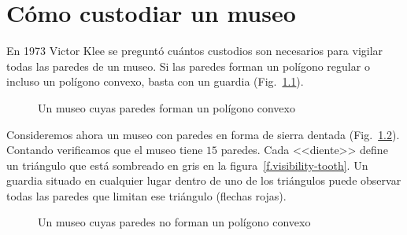 
\chapter{Cómo custodiar un museo}\label{c.museum}


En 1973 Victor Klee se preguntó cuántos custodios son necesarios para vigilar todas las paredes de un museo. Si las paredes forman un polígono regular o incluso un polígono convexo, basta con un guardia (Fig.~\ref{f.museum.convex}).
\begin{figure}[ht]
\begin{center}
\end{center}
\caption{Un museo cuyas paredes forman un polígono convexo}\label{f.museum.convex}
\end{figure}

Consideremos ahora un museo con paredes en forma de sierra dentada (Fig.~\ref{f.museum.nonconvex}). Contando verificamos que el museo tiene $15$ paredes. Cada <<diente>> define un triángulo que está sombreado en gris en la figura~\ref{f.visibility-tooth}. Un guardia situado en cualquier lugar dentro de uno de los triángulos puede observar todas las paredes que limitan ese triángulo (flechas rojas).
\begin{figure}[b]
\begin{center}
\end{center}
\caption{Un museo cuyas paredes no forman un polígono convexo}\label{f.museum.nonconvex}
\end{figure}

